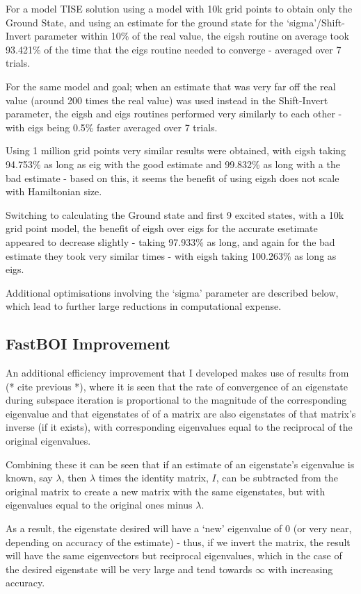 For a model TISE solution using a model with 10k grid points to obtain only the Ground State, and using an estimate for the ground state for the `sigma'/Shift-Invert parameter within 10\% of the real value, the eigsh routine on average took 93.421\% of the time that the eigs routine needed to converge - averaged over 7 trials. 

For the same model and goal; when an estimate that was very far off the real value (around 200 times the real value) was used instead in the Shift-Invert parameter, the eigsh and eigs routines performed very similarly to each other - with eigs being 0.5\% faster averaged over 7 trials.

Using 1 million grid points very similar results were obtained, with eigsh taking 94.753\% as long as eig with the good estimate and 99.832\% as long with a the bad estimate - based on this, it seems the benefit of using eigsh does not scale with Hamiltonian size.

Switching to calculating the Ground state and first 9 excited states, with a 10k grid point model, the benefit of eigsh over eigs for the accurate esetimate appeared to decrease slightly - taking 97.933\% as long, and again for the bad estimate they took very similar times - with eigsh taking 100.263\% as long as eigs.

Additional optimisations involving the `sigma' parameter are described below, which lead to further large reductions in computational expense.

\subsection{FastBOI Improvement}
An additional efficiency improvement that I developed makes use of results from (* cite previous *), where it is seen that the rate of convergence of an eigenstate during subspace iteration is proportional to the magnitude of the corresponding eigenvalue and that eigenstates of of a matrix are also eigenstates of that matrix's inverse (if it exists), with corresponding eigenvalues equal to the reciprocal of the original eigenvalues. 

Combining these it can be seen that if an estimate of an eigenstate's eigenvalue is known, say $\lambda$, then $\lambda$ times the identity matrix, $I$, can be subtracted from the original matrix to create a new matrix with the same eigenstates, but with eigenvalues equal to the original ones minus $\lambda$. 

As a result, the eigenstate desired will have a `new' eigenvalue of $0$ (or very near, depending on accuracy of the estimate) - thus, if we invert the matrix, the result will have the same eigenvectors but reciprocal eigenvalues, which in the case of the desired eigenstate will be very large and tend towards $\infty$ with increasing accuracy. 

